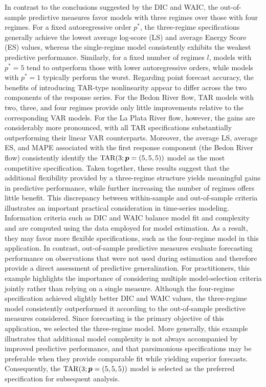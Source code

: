 In contrast to the conclusions suggested by the DIC and WAIC, the out-of-sample predictive measures favor models with three regimes over those with four regimes. For a fixed autoregressive order $p^*$, the three-regime specifications generally achieve the lowest average log-score (LS) and average Energy Score (ES) values, whereas the single-regime model consistently exhibits the weakest predictive performance. Similarly, for a fixed number of regimes $l$, models with $p^*=5$ tend to outperform those with lower autoregressive orders, while models with $p^*=1$ typically perform the worst. Regarding point forecast accuracy, the benefits of introducing TAR-type nonlinearity appear to differ across the two components of the response series. For the Bedon River flow, TAR models with two, three, and four regimes provide only little improvements relative to the corresponding VAR models. For the La Plata River flow, however, the gains are considerably more pronounced, with all TAR specifications substantially outperforming their linear VAR counterparts. Moreover, the average LS, average ES, and MAPE associated with the first response component (the Bedon River flow) consistently identify the ${\rm TAR}(3;\bm{p}=(5,5,5))$ model as the most competitive specification. Taken together, these results suggest that the additional flexibility provided by a three-regime structure yields meaningful gains in predictive performance, while further increasing the number of regimes offers little benefit. This discrepancy between within-sample and out-of-sample criteria illustrates an important practical consideration in time-series modeling. Information criteria such as DIC and WAIC balance model fit and complexity and are computed using the data employed for model estimation. As a result, they may favor more flexible specifications, such as the four-regime model in this application. In contrast, out-of-sample predictive measures evaluate forecasting performance on observations that were not used during estimation and therefore provide a direct assessment of predictive generalization. For practitioners, this example highlights the importance of considering multiple model-selection criteria jointly rather than relying on a single measure. Although the four-regime specification achieved slightly better DIC and WAIC values, the three-regime model consistently outperformed it according to the out-of-sample predictive measures considered. Since forecasting is the primary objective of this application, we selected the three-regime model. More generally, this example illustrates that additional model complexity is not always accompanied by improved predictive performance, and that parsimonious specifications may be preferable when they provide comparable fit while yielding superior forecasts. Consequently, the ${\rm TAR}(3;\bm{p}=(5,5,5))$ model is selected as the preferred specification for subsequent analysis.

